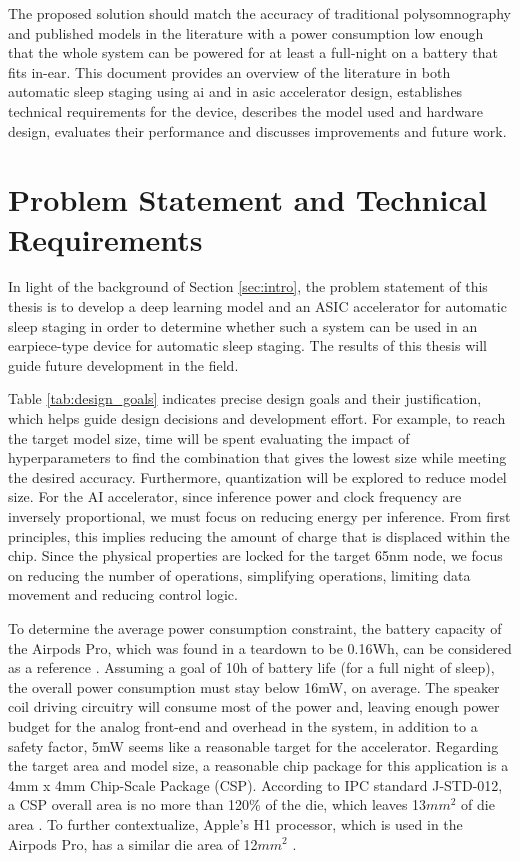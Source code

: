 \documentclass[12pt]{article}
\begin{document}
The proposed solution should match the accuracy of traditional polysomnography and published models in the literature with a power consumption low enough that the whole system
can be powered for at least a full-night on a battery that fits in-ear. This document provides an overview of the literature in both automatic sleep staging using \ac{ai} and in
\ac{asic} accelerator design, establishes technical requirements for the device, describes the model used and hardware design, evaluates their performance and discusses improvements
and future work.
\newpage

\section{Problem Statement and Technical Requirements}
\label{sec:prob_statement}
In light of the background of Section \ref{sec:intro}, the problem statement of this thesis is to develop a deep learning model and an ASIC accelerator for automatic sleep staging
in order to determine whether such a system can be used in an earpiece-type device for automatic sleep staging. The results of this thesis will guide future development in the field.

Table \ref{tab:design_goals} indicates precise design goals and their justification, which helps guide design decisions and development effort. For example, to reach the target
model size, time will be spent evaluating the impact of hyperparameters to find the combination that gives the lowest size while meeting the desired accuracy. Furthermore,
quantization will be explored to reduce model size. For the AI accelerator, since inference power and clock frequency are inversely proportional, we must focus on reducing energy
per inference. From first principles, this implies reducing the amount of charge that is displaced within the chip. Since the physical properties are locked for the target 65nm node,
we focus on reducing the number of operations, simplifying operations, limiting data movement and reducing control logic.

To determine the average power consumption constraint, the battery capacity of the Airpods Pro, which was found in a teardown to be 0.16Wh, can be considered as a reference
\cite*{AirpodsIfixitTeardown}. Assuming a goal of 10h of battery life (for a full night of sleep), the overall power consumption must stay below 16mW, on average. The speaker coil
driving circuitry will consume most of the power and, leaving enough power budget for the analog front-end and overhead in the system, in addition to a safety factor, 5mW seems
like a reasonable target for the accelerator. Regarding the target area and model size, a reasonable chip package for this application is a 4mm x 4mm Chip-Scale Package (CSP).
According to IPC standard J-STD-012, a CSP overall area is no more than 120\% of the die, which leaves 13$mm^2$ of die area \cite*{J_STD_012}. To further contextualize, Apple's
H1 processor, which is used in the Airpods Pro, has a similar die area of 12$mm^2$ \cite*{H1DieSize}.
\end{document}
